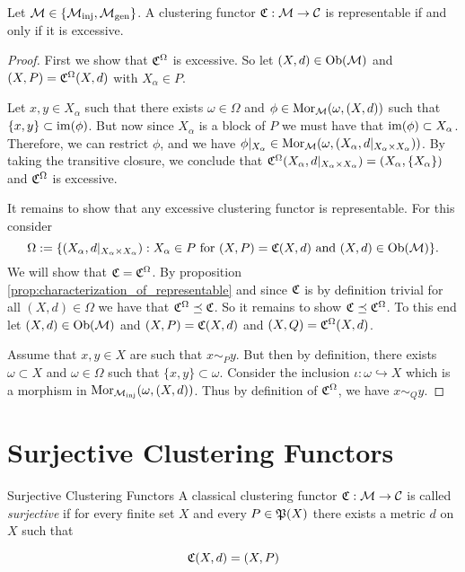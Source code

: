\begin{theorem}{\cite[Thm.~6.2]{Carlsson2010}}{}
Let $\M \in \{\inj, \gen\}$. A clustering functor $\Cf: \M \to \C$ is representable if and only if it is excessive.
\end{theorem}

\begin{proof}
First we show that $\Cf^\Omega$ is excessive. So let $(X,d) \in \ob(\M)$ and $(X,P) = \Cf^\Omega(X,d)$ with $X_\alpha \in P$.

Let $x,y \in X_\alpha$ such that there exists $\omega \in \Omega$ and $\phi \in \mor_\M(\omega, (X,d))$ such that ${\{x,y\} \subset \image(\phi)}$. But now since $X_\alpha$ is a block of $P$ we must have that $\image(\phi) \subset X_\alpha$. Therefore, we can restrict $\phi$, and we have $\phi|_{X_\alpha} \in \mor_\M(\omega, (X_\alpha, d|_{X_\alpha \times X_\alpha}))$. By taking the transitive closure, we conclude that $\Cf^\Omega(X_\alpha, d|_{X_\alpha \times X_\alpha}) = (X_\alpha, \{X_\alpha\})$ and $\Cf^\Omega$ is excessive.

It remains to show that any excessive clustering functor is representable. For this consider
$$
\Omega := \{(X_\alpha, d|_{X_\alpha \times X_\alpha}): X_\alpha \in P \text{ for } (X, P) = \Cf(X,d) \text{ and } (X,d) \in \ob(\M)\}.
$$
We will show that $\Cf = \Cf^\Omega$. By proposition \ref{prop:characterization_of_representable} and since $\Cf$ is by definition trivial for all $(X,d) \in \Omega$ we have that $\Cf^\Omega \refines \Cf$. So it remains to show $\Cf \refines \Cf^\Omega$. To this end let $(X,d) \in \ob(\M)$ and $(X,P) = \Cf(X,d)$ and $(X,Q) = \Cf^\Omega(X,d)$.

Assume that $x,y \in X$ are such that $x \sim_P y$. But then by definition, there exists $\omega \subset X$ and $\omega \in \Omega$ such that $\{x,y\} \subset \omega$. Consider the inclusion $\iota: \omega \hookrightarrow X$ which is a morphism in $\mor_\inj(\omega, (X,d))$. Thus by definition of $\Cf^\Omega$, we have $x \sim_Q y$.

\end{proof}

\section{Surjective Clustering Functors}

\begin{definition}{Surjective Clustering Functors}{}
    A classical clustering functor $\Cf: \M \to \C$ is called \emph{surjective} if for every finite set $X$ and every $P \in \P(X)$ there exists a metric $d$ on $X$ such that

    \begin{equation*}
        \Cf(X,d) = (X,P)
    \end{equation*}

\end{definition}

